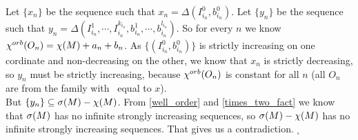 Let $\{x_n\}$ be the sequence such that $x_n = \Delta(I^0_{i_n},b^0_{i_n})$.
Let $\{y_n\}$ be the sequence such that $y_n = \Delta(I^1_{i_n},\cdots,
I^{k_{i_n}}_{i_n}, b^1_{i_n},
\cdots, b^{l_{i_n}}_{i_n})$. 
So for every $n$ we know ${\chi^{orb}(O_n)} = \chi(M) + a_n + b_n$. As $\{(I^0_{i_n}, b^0_{i_n})\}$ 
is strictly 
increasing on one cordinate and non-decreasing on the other, we know 
that $x_n$ is strictly decreasing, so $y_n$ must be strictly 
increasing,  
because ${\chi^{orb}(O_n)}$ is constant for all $n$ (all $O_n$ 
are from the family with \Eoc\ equal to $x$). \\ 
But $\{y_n\} \subseteq {{\sigma}(M)} - \chi(M)$. 
From \ref{well_order} and \ref{times_two_fact} we know that ${{\sigma}(M)}$ has no infinite 
strongly increasing sequences, so 
${{\sigma}(M)} - \chi(M)$ has no infinite strongly increasing sequences. That gives us a 
contradiction.
$_\square$ 



